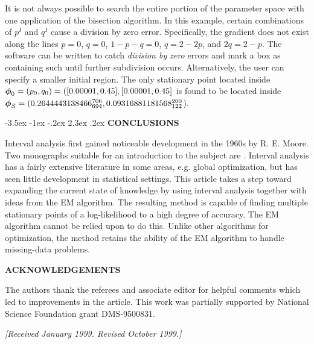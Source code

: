 \documentclass[10pt,twoside]{article}
\makeatletter
\renewcommand\section{\@startsection {section}{1}{\z@}%
                 {-3.5ex \@plus -1ex \@minus -.2ex}%
                 {2.3ex \@plus.2ex}%
                 {\normalfont\centering\bfseries }}
\makeatother
\begin{document}
It is not always possible to search the entire portion of the
parameter space with one application of the bisection algorithm.
In this example, certain combinations of $p^I$ and $q^I$ cause a
division by zero error.  Specifically, the gradient does not exist along the
lines $p=0$, $q=0$, $1-p-q=0$, $q=2-2p$, and $2q=2-p$.  The software
can be written to catch {\it division by zero} errors and mark a box as
containing such until further subdivision occurs.  Alternatively, the user 
can specify a smaller initial region.  
The only stationary point located inside 
$\mbox{\boldmath $\phi$}_0 = (p_0,q_0) =([0.00001,0.45],[0.00001,0.45]$ is 
found to be located inside
$\mbox{\boldmath $\phi$}_S= (0.2644443138466_{694}^{706} , 0.09316881181568_{122}^{200}$).

%
\section{\bf CONCLUSIONS}\label{sec:conclusions}

Interval analysis first gained noticeable development in the 1960s by
R. E. Moore.   Two monographs suitable for an
introduction to the subject are \cite{Moore66,Moore79}.  Interval analysis has
a fairly extensive 
literature in some areas, e.g. global optimization, but has seen little
development in statistical settings.  This article takes a step toward 
expanding the current state of knowledge by 
using interval analysis together with ideas
from the EM algorithm.  The resulting method is capable of finding multiple
stationary points of a log-likelihood to a high degree of accuracy.  The EM
algorithm cannot be relied upon to do this.  Unlike
other algorithms for optimization, the method retains the ability of the EM
algorithm to handle missing-data problems.
\linebreak

\begin{center}
{\bf ACKNOWLEDGEMENTS}
\end{center}

{\small The authors thank the referees and associate editor for helpful 
comments which led to improvements in the article. 
This work was partially supported by National Science Foundation
grant DMS-9500831.}

\begin{center}
{\it [Received January 1999. Revised October 1999.]}
\end{center}

\setlength{\bibsep}{4pt} %

\end{document}
